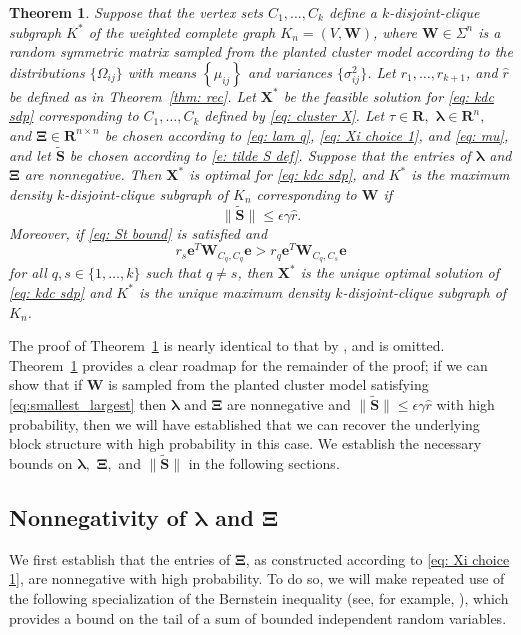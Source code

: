 \documentclass[twoside,11pt]{article}
\newtheorem{theorem}{Theorem}[section]
\newcommand{\R}{\mathbf{R}}
\newcommand{\St}{\bs{\tilde S}}
\newcommand{\e}{\bs {e}}
\newcommand{\bs}{\boldsymbol}
\newcommand{\X}{\bs {X}}
\newcommand{\W}{\bs {W}}
\newcommand{\0}{\bs{0}}
\newcommand{\bra}[1]{\ensuremath{\left\{ #1 \right\}}} %
\begin{document}
{\begin{theorem} \label{T: S opt conds}
	Suppose that the vertex sets $C_1, \dots, C_k$ define a $k$-disjoint-clique subgraph $K^*$ of
	the weighted complete graph $K_n = (V, \W)$, where
	$\W \in \Sigma^n$ is a random symmetric matrix sampled from the planted cluster model
  according to the distributions \(\{\Omega_{ij}\}\) with means \( \bra{\mu_{ij}} \)
  and variances $\{\sigma^2_{ij}\}$.
	Let $r_1, \dots, r_{k+1}$, and  $\hat r$ be defined as in Theorem~\ref{thm: rec}.
	Let $\X^*$ be the feasible solution for \eqref{eq: kdc sdp} corresponding to $C_1, \dots, C_k$ defined
	by \eqref{eq: cluster X}. Let $\tau \in \R,$ $\bs\lambda \in \R^n,$  and $\bs\Xi \in \R^{n\times n}$
	be chosen according to \eqref{eq: lam q},  \eqref{eq: Xi choice 1},
	and \eqref{eq: mu},
	and let $\St$ be chosen according to \eqref{e: tilde S def}.
	Suppose that the entries of  $\bs\lambda$ and  $\bs\Xi$ are nonnegative.
	Then
	$\X^*$ is optimal for \eqref{eq: kdc sdp}, and $K^*$  is the maximum density
	$k$-disjoint-clique
	subgraph of $K_n$ corresponding to $\W$ if
	\begin{equation} \label{eq: St bound}
	\| \St\| \le  \epsilon \gamma \hat r.
	\end{equation}
	Moreover, if \eqref{eq: St bound} is satisfied and
	\begin{equation} \label{a: block weights}
	r_s \e^T \W_{C_q, C_q} \e > r_q \e^T \W_{C_q, C_s} \e
	\end{equation}
	for all $q, s \in \{1,\dots,k\}$ such that $q\neq s$,
	then $\X^*$ is the unique optimal solution of \eqref{eq: kdc sdp} and
	$K^*$ is the unique maximum density $k$-disjoint-clique
	subgraph of $K_n$.
\end{theorem}

The proof of Theorem~\ref{T: S opt conds} is nearly identical to that by \citet[Theorem~4.2]{ames2014guaranteed}, and is
omitted.
Theorem~\ref{T: S opt conds} provides a clear roadmap for the remainder of the proof; if we can show that if \(\W\) is sampled from the planted cluster
model satisfying \eqref{eq:smallest_largest} then \(\bs \lambda\)
and \(\bs \Xi\) are nonnegative and \(\|\St\| \le \epsilon \gamma \hat r\) with high probability, then we will have established that we can recover the underlying block
structure with high probability in this case. We establish the necessary bounds on \(\bs \lambda,\) \(\bs \Xi,\) and \(\|\St\|\)
in the following sections.

\subsection{Nonnegativity of \(\bs\lambda\) and \(\bs\Xi\)}
\label{sec: nonneg}
We first establish that the entries of \(\bs \Xi\), as constructed according to \eqref{eq: Xi choice 1},
are nonnegative with high probability.
To do so, we will make repeated use of the following specialization of the
Bernstein inequality (see, for example,
\citet[Theorem~6]{lugosi2009}),
which provides a  bound on the tail of a sum of bounded independent random variables.

}
\end{document}
